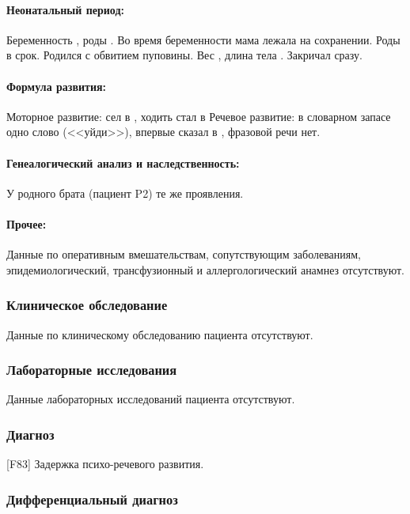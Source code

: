\documentclass[a4paper,14pt]{extarticle}
\newcommand{\gramm}{г}
\newcommand{\cm}{см}
\newcommand{\months}{мес.}
\newcommand{\DS}[2]{[#2] #1}
\begin{document}
\paragraph{Неонатальный период:} Беременность , роды . Во время беременности мама лежала на сохранении. Роды в срок. Родился с обвитием пуповины.
Вес \numprint[\gramm]{4470}, длина тела \numprint[\cm]{57}.
Закричал сразу. 

\paragraph{Формула развития:} Моторное развитие: сел в \numprint[\months]{7}, ходить стал в \numprint[\months]{10} 
Речевое развитие: в словарном запасе одно слово (<<уйди>>), впервые сказал в , фразовой речи нет.

\paragraph{Генеалогический анализ и наследственность:} У родного брата (пациент P2) те же проявления.

\paragraph{Прочее:} Данные по оперативным вмешательствам, сопутствующим заболеваниям, эпидемиологический, трансфузионный и аллергологический анамнез отсутствуют.

\subsubsection*{Клиническое обследование}

Данные по клиническому обследованию пациента отсутствуют.

\subsubsection*{Лабораторные исследования}

Данные лабораторных исследований пациента отсутствуют.

\subsubsection*{Диагноз}

\DS{Задержка психо-речевого развития}{F83}.

\subsubsection*{Дифференциальный диагноз}
\end{document}
